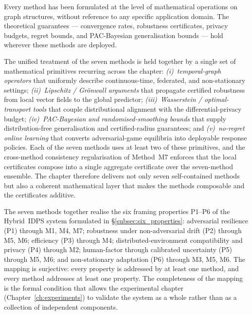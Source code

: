 Every method has been formulated at the level of mathematical operations on graph structures, without reference to any specific application domain. The theoretical guarantees --- convergence rates, robustness certificates, privacy budgets, regret bounds, and PAC-Bayesian generalisation bounds --- hold wherever these methods are deployed.

The unified treatment of the seven methods is held together by a single set of mathematical primitives recurring across the chapter: \emph{(i)~temporal-graph operators} that uniformly describe continuous-time, federated, and non-stationary settings; \emph{(ii)~Lipschitz / Gr\"onwall arguments} that propagate certified robustness from local vector fields to the global predictor; \emph{(iii)~Wasserstein / optimal-transport tools} that couple distributional alignment with the differential-privacy budget; \emph{(iv)~PAC-Bayesian and randomised-smoothing bounds} that supply distribution-free generalisation and certified-radius guarantees; and \emph{(v)~no-regret online learning} that converts adversarial-game equilibria into deployable response policies. Each of the seven methods uses at least two of these primitives, and the cross-method consistency regularisation of Method~M7 enforces that the local certificates compose into a single aggregate certificate over the seven-method ensemble. The chapter therefore delivers not only seven self-contained methods but also a coherent mathematical layer that makes the methods composable and the certificates additive.

The seven methods together realise the six framing properties P1--P6 of the Hybrid~IDPS system formulated in \S\ref{subsec:six_properties}: adversarial resilience (P1) through M1, M4, M7; robustness under non-adversarial drift (P2) through M5, M6; efficiency (P3) through M4; distributed-environment compatibility and privacy (P4) through M2; human-factor through calibrated uncertainty (P5) through M5, M6; and non-stationary adaptation (P6) through M3, M5, M6. The mapping is surjective: every property is addressed by at least one method, and every method addresses at least one property. The completeness of the mapping is the formal condition that allows the experimental chapter (Chapter~\ref{ch:experiments}) to validate the system as a whole rather than as a collection of independent components.

